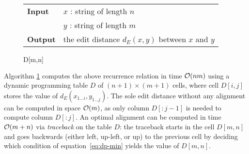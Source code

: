 \begin{figure*}[b!]
\begin{center}
\begin{minipage}[t]{.9\textwidth}
\begin{algorithm}[H]
\begin{tabular}{ll}
\textbf{Input}  & $x$ : string of length $n$\\
				& $y$ : string of length $m$\\
\textbf{Output} & the edit distance $d_E(x,y)$ between $x$ and $y$\\
\end{tabular}
\begin{algorithmic}[1]
\EndFor
{}
	\EndFor
\EndFor
\State \Return D[m,n]
\end{algorithmic}
\label{alg:dp-edit}
\end{algorithm}
\end{minipage}
\end{center}
\end{figure*}

Algorithm \ref{alg:dp-edit} computes the above recurrence relation in time $\mathcal{O}(nm)$ using a dynamic programming table $D$ of $(n+1) \times (m+1)$ cells, where cell $D[i,j]$ stores the value of $d_E(x_{1 \dots i},y_{1 \dots j})$.
The sole edit distance without any alignment can be computed in space $\mathcal{O}(m)$, as only column $D[:j-1]$ is needed to compute column $D[:j]$.
An optimal alignment can be computed in time $\mathcal{O}(m + n)$ via \emph{traceback} on the table $D$:
the traceback starts in the cell $D[m,n]$ and goes backwards (either left, up-left, or up) to the previous cell by deciding which condition of equation~\ref{eq:dp-min} yields the value of $D[m,n]$.

%



